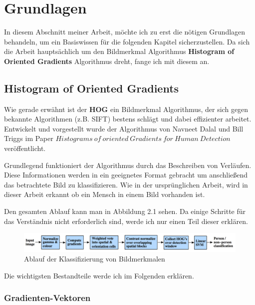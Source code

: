 \chapter{Grundlagen}
\label{chap:grundlagen}

In diesem Abschnitt meiner Arbeit, möchte ich zu erst die nötigen Grundlagen behandeln, um ein Basiswissen für die folgenden Kapitel sicherzustellen.
Da sich die Arbeit hauptsächlich um den Bildmerkmal Algorithmus \textbf{Histogram of Oriented Gradients} Algorithmus dreht, fange ich mit diesem an.

\section{Histogram of Oriented Gradients}
\label{sec:grundlagenhog}
Wie gerade erwähnt ist der \textbf{HOG} ein Bildmerkmal Algorithmus, der sich gegen bekannte Algorithmen (z.B. SIFT) bestens schlägt und dabei  effizienter arbeitet. Entwickelt und vorgestellt wurde der Algorithmus von Navneet Dalal und Bill Triggs im Paper $Histograms~of ~oriented~Gradients~for~Human~Detection$ \cite{dalal:inria-00548512} veröffentlicht.

Grundlegend funktioniert der Algorithmus durch das Beschreiben von Verläufen. Diese Informationen werden in ein geeignetes Format gebracht um anschließend das betrachtete Bild zu klassifizieren. Wie in der ursprünglichen Arbeit, wird in dieser Arbeit erkannt ob ein Mensch in  einem Bild vorhanden ist.

Den gesamten Ablauf kann man in Abbildung 2.1 sehen. Da einige Schritte für das Verständnis nicht erforderlich sind, werde ich nur einen Teil dieser erklären.

\begin{figure}[htbp]\centering 
	\includegraphics[width=1\linewidth]{pics/feature extraction chain.png} 
	\caption{Ablauf der Klassifizierung von Bildmerkmalen
	\cite{dalal:inria-00548512}}\label{fig:grundlagen_feature_extraction_chain}\end{figure}

Die wichtigsten Bestandteile werde ich im Folgenden erklären.

\subsection{Gradienten-Vektoren}

